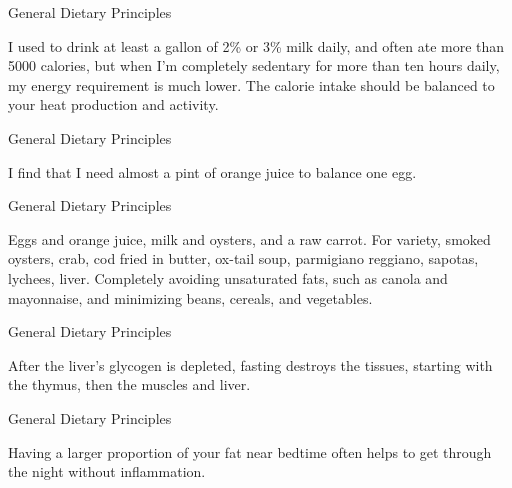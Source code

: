 \documentclass[11pt,oneside,openany,extrafontsizes]{memoir}
\begin{document}
\begin{standalonequote}{General Dietary Principles}

    \begin{answer}
        I used to drink at least a gallon of 2\% or 3\% milk daily, and often ate more than 5000 calories, but when I'm completely sedentary for more than ten hours daily, my energy requirement is much lower. The calorie intake should be balanced to your heat production and activity.
    \end{answer}
\end{standalonequote}

\begin{standalonequote}{General Dietary Principles}

    \begin{answer}
        I find that I need almost a pint of orange juice to balance one egg.
    \end{answer}
\end{standalonequote}

\begin{standalonequote}{General Dietary Principles}

    \begin{answer}
        Eggs and orange juice, milk and oysters, and a raw carrot. For variety, smoked oysters, crab, cod fried in butter, ox-tail soup, parmigiano reggiano, sapotas, lychees, liver. Completely avoiding unsaturated fats, such as canola and mayonnaise, and minimizing beans, cereals, and vegetables.
    \end{answer}
\end{standalonequote}

\begin{standalonequote}{General Dietary Principles}

    \begin{answer}
        After the liver's glycogen is depleted, fasting destroys the tissues, starting with the thymus, then the muscles and liver.
    \end{answer}
\end{standalonequote}

\begin{standalonequote}{General Dietary Principles}

    \begin{answer}
        Having a larger proportion of your fat near bedtime often helps to get through the night without inflammation.
    \end{answer}
\end{standalonequote}
\end{document}
